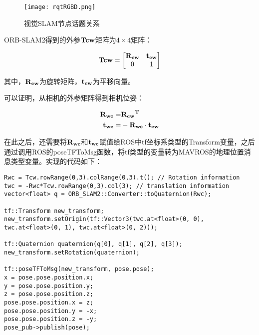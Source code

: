 
\begin{figure}[!ht]
	\centering
	\texttt{[image: rqtRGBD.png]}
	\caption{视觉SLAM节点话题关系}
	\label{fig4-5}
\end{figure}

ORB-SLAM2得到的外参$\bf{Tcw}$矩阵为$4 \times 4$矩阵：

\begin{equation}
\bf{Tcw}=\begin{bmatrix}
\bf{R_{cw}} & \bf{t_{cw}}\\0 & 1
\end{bmatrix}
\end{equation}

其中，$\bf{R_{cw}}$为旋转矩阵，$\bf{t_{cw}}$为平移向量。

可以证明，从相机的外参矩阵得到相机位姿：

\begin{equation}
\begin{aligned}
\bf{R_{wc}}= &\bf{R_{cw}}^T\\
\bf{t_{wc}}= &-\bf{R_{wc}} \cdot  \bf{t_{cw}}
\end{aligned}
\end{equation}

在此之后，还需要将$\bf{R_{wc}}$和$\bf{t_{wc}}$赋值给ROS中tf坐标系类型的Transform变量，之后通过调用ROS的poseTFToMsg函数，将tf类型的变量转为MAVROS的地理位置消息类型变量。实现的代码如下：

\begin{verbatim}
Rwc = Tcw.rowRange(0,3).colRange(0,3).t(); // Rotation information
twc = -Rwc*Tcw.rowRange(0,3).col(3); // translation information
vector<float> q = ORB_SLAM2::Converter::toQuaternion(Rwc);

tf::Transform new_transform;
new_transform.setOrigin(tf::Vector3(twc.at<float>(0, 0), 
twc.at<float>(0, 1), twc.at<float>(0, 2)));

tf::Quaternion quaternion(q[0], q[1], q[2], q[3]);
new_transform.setRotation(quaternion);

tf::poseTFToMsg(new_transform, pose.pose);
x = pose.pose.position.x;
y = pose.pose.position.y;
z = pose.pose.position.z;
pose.pose.position.x = z;
pose.pose.position.y = -x;
pose.pose.position.z = -y;
pose_pub->publish(pose);
\end{verbatim}

